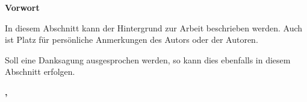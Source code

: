 \clearpage

{\LARGE\textbf{Vorwort}}
\vspace{1em}

\itshape

In diesem Abschnitt kann der Hintergrund zur Arbeit beschrieben werden. Auch ist Platz für persönliche Anmerkungen des Autors oder der Autoren.

Soll eine Danksagung ausgesprochen werden, so kann dies ebenfalls in diesem Abschnitt erfolgen.

\normalfont

\vspace{1em}
\begin{flushright}
    \textbf{\studentAName,\xspace \documentMonthOfYear \xspace \documentYear}
\end{flushright}
